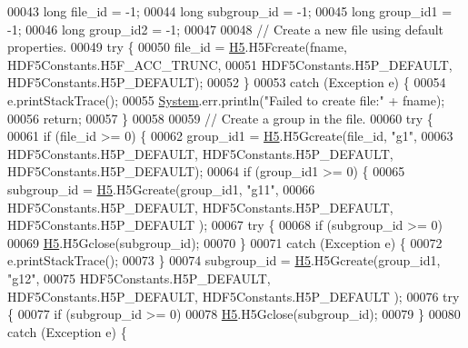 \begin{DoxyCode}
00043         \textcolor{keywordtype}{long} file\_id = -1;
00044         \textcolor{keywordtype}{long} subgroup\_id = -1;
00045         \textcolor{keywordtype}{long} group\_id1 = -1;
00046         \textcolor{keywordtype}{long} group\_id2 = -1;
00047 
00048         \textcolor{comment}{// Create a new file using default properties.}
00049         \textcolor{keywordflow}{try} \{
00050             file\_id = \hyperlink{namespace_h5}{H5}.H5Fcreate(fname, HDF5Constants.H5F\_ACC\_TRUNC,
00051                     HDF5Constants.H5P\_DEFAULT, HDF5Constants.H5P\_DEFAULT);
00052         \}
00053         \textcolor{keywordflow}{catch} (Exception e) \{
00054             e.printStackTrace();
00055             \hyperlink{namespace_system}{System}.err.println(\textcolor{stringliteral}{"Failed to create file:"} + fname);
00056             \textcolor{keywordflow}{return};
00057         \}
00058 
00059         \textcolor{comment}{// Create a group in the file.}
00060         \textcolor{keywordflow}{try} \{
00061             \textcolor{keywordflow}{if} (file\_id >= 0) \{
00062                 group\_id1 = \hyperlink{namespace_h5}{H5}.H5Gcreate(file\_id, \textcolor{stringliteral}{"g1"},
00063                         HDF5Constants.H5P\_DEFAULT, HDF5Constants.H5P\_DEFAULT, HDF5Constants.H5P\_DEFAULT);
00064                 \textcolor{keywordflow}{if} (group\_id1 >= 0) \{
00065                     subgroup\_id = \hyperlink{namespace_h5}{H5}.H5Gcreate(group\_id1, \textcolor{stringliteral}{"g11"},
00066                             HDF5Constants.H5P\_DEFAULT, HDF5Constants.H5P\_DEFAULT, HDF5Constants.H5P\_DEFAULT
      );
00067                     \textcolor{keywordflow}{try} \{
00068                         \textcolor{keywordflow}{if} (subgroup\_id >= 0)
00069                             \hyperlink{namespace_h5}{H5}.H5Gclose(subgroup\_id);
00070                     \}
00071                     \textcolor{keywordflow}{catch} (Exception e) \{
00072                         e.printStackTrace();
00073                     \}
00074                     subgroup\_id = \hyperlink{namespace_h5}{H5}.H5Gcreate(group\_id1, \textcolor{stringliteral}{"g12"},
00075                             HDF5Constants.H5P\_DEFAULT, HDF5Constants.H5P\_DEFAULT, HDF5Constants.H5P\_DEFAULT
      );
00076                     \textcolor{keywordflow}{try} \{
00077                         \textcolor{keywordflow}{if} (subgroup\_id >= 0)
00078                             \hyperlink{namespace_h5}{H5}.H5Gclose(subgroup\_id);
00079                     \}
00080                     \textcolor{keywordflow}{catch} (Exception e) \{

\end{DoxyCode}
